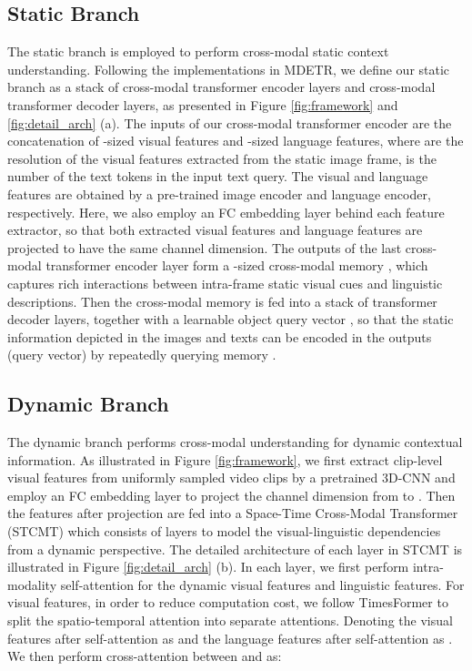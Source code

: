 \documentclass[sigconf]{acmart}
\begin{document}
\subsection{Static Branch}
The static branch is employed to perform cross-modal static context understanding. Following the implementations in MDETR\cite{mdetr}, we define our static branch as a stack of  cross-modal transformer encoder layers and  cross-modal transformer decoder layers, as presented in Figure \ref{fig:framework} and \ref{fig:detail_arch} (a). The inputs of our cross-modal transformer encoder are the concatenation of -sized visual features and -sized language features, where  are the resolution of the visual features extracted from the static image frame,  is the number of the text tokens in the input text query. The visual and language features are obtained by a pre-trained image encoder and language encoder\cite{roberta}, respectively. Here, we also employ an FC embedding layer behind each feature extractor, so that both extracted visual features and language features are projected to have the same channel dimension. The outputs of the last cross-modal transformer encoder layer form a -sized cross-modal memory , which captures rich interactions between intra-frame static visual cues and linguistic descriptions. Then the cross-modal memory is fed into a stack of  transformer decoder layers, together with a learnable object query vector , so that the static information depicted in the images and texts can be encoded in the outputs (query vector) by repeatedly querying memory .

\subsection{Dynamic Branch}
The dynamic branch performs cross-modal understanding for dynamic contextual information. As illustrated in Figure \ref{fig:framework}, we first extract clip-level visual features  from  uniformly sampled video clips by a pretrained 3D-CNN\cite{slowfast} and employ an FC embedding layer to project the channel dimension from  to . Then the features after projection are fed into a Space-Time Cross-Modal Transformer (STCMT) which consists of  layers to model the visual-linguistic dependencies from a dynamic perspective. The detailed architecture of each layer in STCMT is illustrated in Figure \ref{fig:detail_arch} (b). In each layer, we first perform intra-modality self-attention for the dynamic visual features and linguistic features. For visual features, in order to reduce computation cost, we follow TimesFormer\cite{TimesFormer} to split the spatio-temporal attention into separate attentions. Denoting the visual features after self-attention as  and the language features after self-attention as . We then perform cross-attention between  and  as: 
\end{document}
